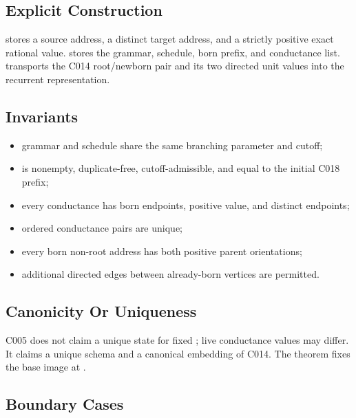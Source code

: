 \subsection{Explicit Construction}\label{explicit-construction-5}

\texttt{\protect{}} stores a source address, a distinct target
address, and a strictly positive exact rational value.
\texttt{\protect{}} stores the grammar, schedule, born prefix,
and conductance list. \texttt{\protect{}} transports the C014
root/newborn pair and its two directed unit values into the recurrent
representation.

\subsection{Invariants}\label{invariants-5}

\begin{itemize}
\tightlist
\item
  grammar and schedule share the same branching parameter and cutoff;
\item
  \texttt{\protect{}} is nonempty, duplicate-free, cutoff-admissible,
  and equal to the initial C018 prefix;
\item
  every conductance has born endpoints, positive value, and distinct
  endpoints;
\item
  ordered conductance pairs are unique;
\item
  every born non-root address has both positive parent orientations;
\item
  additional directed edges between already-born vertices are permitted.
\end{itemize}

\subsection{Canonicity Or Uniqueness}\label{canonicity-or-uniqueness-5}

C005 does not claim a unique state for fixed \texttt{\protect{}}; live
conductance values may differ. It claims a unique schema and a canonical
embedding of C014. The theorem \texttt{\protect{}} fixes the base
image at \texttt{\protect{}}.

\subsection{Boundary Cases}\label{boundary-cases-5}

